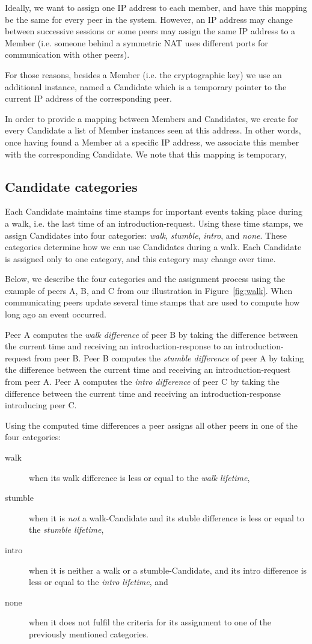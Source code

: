 Ideally, we want to assign one IP address to each member, and have
this mapping be the same for every peer in the system.  However, an IP
address may change between successive sessions or some peers may
assign the same IP address to a Member (i.e. someone behind a
symmetric NAT uses different ports for communication with other
peers).

For those reasons, besides a Member (i.e. the cryptographic key) we
use an additional instance, named a Candidate which is a temporary
pointer to the current IP address of the corresponding peer.

In order to provide a mapping between Members and Candidates, we
create for every Candidate a list of Member instances seen at this
address.  In other words, once having found a Member at a specific IP
address, we associate this member with the corresponding Candidate.
We note that this mapping is temporary,

\subsection{Candidate categories}
\label{sec-2-1}
Each Candidate maintains time stamps for important events taking place
during a walk, i.e. the last time of an introduction-request.  Using
these time stamps, we assign Candidates into four categories: \emph{walk},
\emph{stumble}, \emph{intro}, and \emph{none}.  These categories determine how we can
use Candidates during a walk.  Each Candidate is assigned only to one
category, and this category may change over time.

Below, we describe the four categories and the assignment process
using the example of peers A, B, and C from our illustration in
Figure~\ref{fig:walk}.  When communicating peers update several time
stamps that are used to compute how long ago an event occurred.

Peer A computes the \emph{walk difference} of peer B by taking the
difference between the current time and receiving an
introduction-response to an introduction-request from peer B.  Peer B
computes the \emph{stumble difference} of peer A by taking the difference
between the current time and receiving an introduction-request from
peer A.  Peer A computes the \emph{intro difference} of peer C by taking
the difference between the current time and receiving an
introduction-response introducing peer C.

Using the computed time differences a peer assigns all other peers in
one of the four categories:
\begin{description}
\item[{walk}] when its walk difference is less or equal to the \emph{walk
lifetime},
\item[{stumble}] when it is \emph{not} a walk-Candidate and its stuble
difference is less or equal to the \emph{stumble lifetime},
\item[{intro}] when it is neither a walk or a stumble-Candidate, and its
intro difference is less or equal to the \emph{intro lifetime},
and
\item[{none}] when it does not fulfil the criteria for its assignment to
one of the previously mentioned categories.
\end{description}


